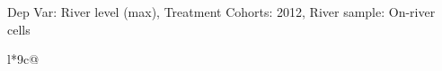 \begin{table}[H]
\captionlistentry[table]{}
\label{table:beaver_hydrometry_DVlevel_max_SCg1}
\tiny %
Dep Var: River level (max), Treatment Cohorts: 2012, River sample: On-river cells \\
\begin{threeparttable}
\begin{tabulary}{\textwidth}{l*{9}{c}@{}}
\toprule \toprule
\noalign{\smallskip}
\noalign{\smallskip}
\midrule \bottomrule
\end{tabulary}
\medskip
\end{threeparttable}
\end{table}
